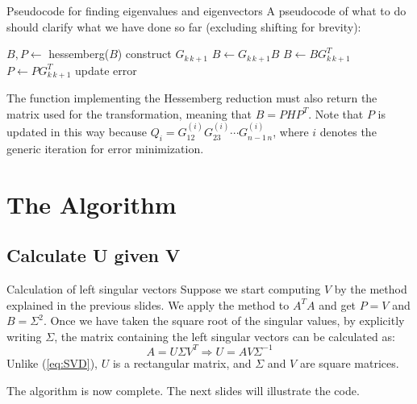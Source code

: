 \documentclass[10pt]{beamer}
\begin{document}
\begin{frame}{Pseudocode for finding eigenvalues and eigenvectors}
    A pseudocode of what to do should clarify what we have done so far (excluding shifting for brevity):
    \begin{algorithmic}
        \footnotesize
        \State $B, P \gets $ hessemberg($ B $)
                \State construct $G_{k \, k+1}$
                \State $B \gets G_{k \, k+1} B$
            \EndFor
                \State $B \gets B G_{k \, k+1}^T$
                \State $P \gets P G_{k \, k+1}^T$
            \EndFor
            \State update error
        \EndWhile
    \end{algorithmic}
    The function implementing the Hessemberg reduction must also return the matrix used for the transformation, meaning that $B = P H P^T$. \newline
    Note that $P$ is updated in this way because $Q_i = G_{12}^{(i)} G_{23}^{(i)} \cdots G_{n-1 \, n}^{(i)}$, where $i$ denotes the generic iteration for error minimization.
\end{frame}

\section{The Algorithm}

\subsection{Calculate U given V}

\begin{frame}{Calculation of left singular vectors}
    Suppose we start computing $V$ by the method explained in the previous slides. \newline
    We apply the method to $A^T A$ and get $P = V$ and $B = \Sigma^2$. \newline
    Once we have taken the square root of the singular values, by explicitly writing $\Sigma$, the matrix containing the left singular vectors can be calculated as:
    $$
    A = U \Sigma V^T \Rightarrow U = A V \Sigma^{-1}
    $$
    Unlike (\ref{eq:SVD}), $U$ is a rectangular matrix, and $\Sigma$ and $V$ are square matrices. 

    
    The algorithm is now complete. The next slides will illustrate the code.
\end{frame}
\end{document}
